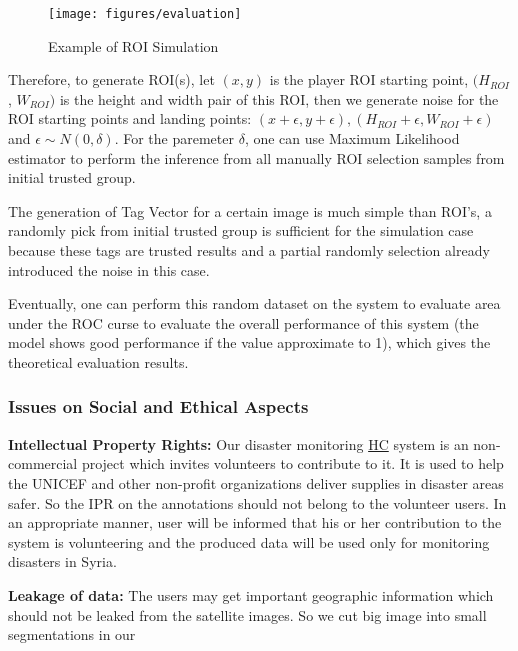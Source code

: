\begin{figure}[htp]
\centering
\texttt{[image: figures/evaluation]}
\caption{Example of ROI Simulation}
\label{fig:evaluation}
\end{figure}

Therefore, to generate ROI(s), let $(x, y)$ is the player ROI starting point, $(H_{ROI}$, $W_{ROI})$ is the height
and width pair of this ROI, then we generate noise for the ROI starting points and landing points: 
$(x+\epsilon, y+\epsilon), (H_{ROI}+\epsilon, W_{ROI}+\epsilon)$ and $\epsilon \sim N(0, \delta)$.
For the paremeter $\delta$, one can use Maximum Likelihood estimator \cite{johansen1990maximum} 
to perform the inference from all manually ROI selection samples from initial trusted group.

The generation of Tag Vector for a certain image is much simple than ROI's, 
a randomly pick from initial trusted group is sufficient for the simulation case 
because these tags are trusted results and a partial randomly selection already introduced the noise in this case.

Eventually, one can perform this random dataset on the system to evaluate area under the ROC curse to
evaluate the overall performance of this system (the model shows good performance if the value approximate to 1), 
which gives the theoretical evaluation results.

\subsubsection{Issues on Social and Ethical Aspects}
\label{chapter:ethical}

\textbf{Intellectual Property Rights:} 
Our disaster monitoring \hyperref[idx:hc]{HC} system is an non-commercial project which invites volunteers to contribute to it. 
It is used to help the UNICEF and other non-profit organizations deliver supplies in disaster areas safer. 
So the IPR on the annotations should not belong to the volunteer users. In an appropriate manner, user will be informed that 
his or her contribution to the system is volunteering and the produced data will be used only for 
monitoring disasters in Syria.

\textbf{Leakage of data:} 
The users may get important geographic information which should not be leaked from the satellite images. So we cut big image into small segmentations in our 











